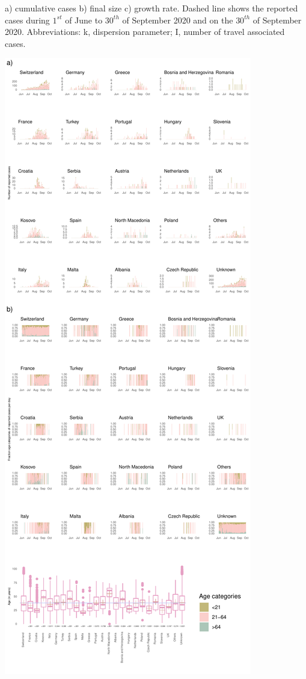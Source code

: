 \documentclass[10pt, a4paper, twoside]{article}
\begin{document}
\begin{suppfigure}[h]
\caption{a) cumulative cases b) final size c) growth rate. Dashed line shows the reported cases during $1^{st}$ of June to $30^{th}$ of September 2020 and on the $30^{th}$ of September 2020. Abbreviations: k, dispersion parameter; I, number of travel associated cases.}
\label{sf2}
\end{suppfigure}


\clearpage
\begin{suppfigure}[h]
\centering
\includegraphics[scale=0.4]{SF3_2021-04-13.pdf}

\end{suppfigure}
\end{document}
